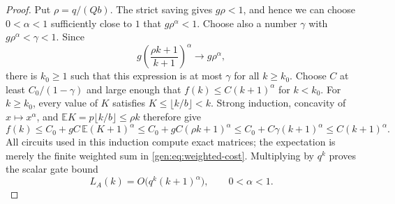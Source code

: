 \begin{proof}
Put $\rho=q/(Qb)$.  The strict saving gives $g\rho<1$, and hence we can
choose $0<\alpha<1$ sufficiently close to $1$ that
$g\rho^\alpha<1$.  Choose also a number $\gamma$ with
$g\rho^\alpha<\gamma<1$.  Since
\[
g\left(\frac{\rho k+1}{k+1}\right)^\alpha
 \longrightarrow g\rho^\alpha,
\]
there is $k_0\geq1$ such that this expression is at most $\gamma$ for all
$k\geq k_0$.  Choose $C$ at least $C_0/(1-\gamma)$ and large enough
that $f(k)\leq C(k+1)^\alpha$ for $k<k_0$.
For $k\geq k_0$, every value of $K$ satisfies
$K\leq\lfloor k/b\rfloor<k$.  Strong induction, concavity of
$x\mapsto x^\alpha$, and $\mathbb E K=p\lfloor k/b\rfloor\leq\rho k$
therefore give
\[
f(k)\leq C_0+gC\,\mathbb E(K+1)^\alpha
 \leq C_0+gC(\rho k+1)^\alpha
 \leq C_0+C\gamma(k+1)^\alpha
 \leq C(k+1)^\alpha.
\]
All circuits used in this induction compute exact matrices; the
expectation is merely the finite weighted sum in
\cref{gen:eq:weighted-cost}.  Multiplying by $q^k$ proves the scalar
gate bound
\[
L_A(k)=O\bigl(q^k(k+1)^\alpha\bigr),\qquad 0<\alpha<1.
\]
\end{proof}
